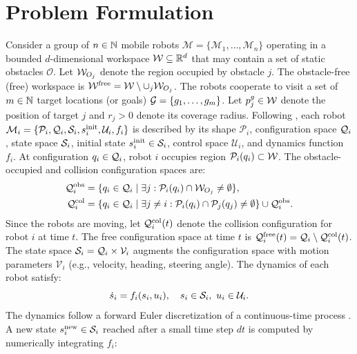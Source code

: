 \documentclass{article}
\providecommand{\obst}{\mathcal{O}}
\providecommand{\free}{\mathrm{free}}
\providecommand{\obs}{\mathrm{obs}}
\providecommand{\col}{\mathrm{col}}
\begin{document}
\section{Problem Formulation}
\label{sec:prob}
Consider a group of $n \in \mathbb{N}$ mobile robots $\mathcal{M} = \{ \mathcal{M}_1, \ldots, \mathcal{M}_n \}$ operating in a bounded $d$-dimensional workspace $\mathcal{W} \subseteq \mathbb{R}^d$ that may contain a set of static obstacles $\obst$. Let $\mathcal{W}_{O_j}$ denote the region occupied by obstacle $j$. The obstacle-free (free) workspace is $\wspace^{\free} = \wspace \setminus \cup_j \wspace_{O_j}$. The robots cooperate to visit a set of $m \in \mathbb{N}$ target locations (or goals) $\mathcal{G} = \{ g_1, \ldots, g_m \}$. Let $p_j^g \in \mathcal{W}$ denote the position of target $j$ and $r_j > 0$ denote its coverage radius. Following \citet{le2021icra}, each robot $\mathcal{M}_i = \{ \mathcal{P}_i, \mathcal{Q}_i, \mathcal{S}_i, s_i^{\operatorname{init}}, \mathcal{U}_i, f_i \}$ is described by its shape $\mathcal{P}_i$, configuration space $\mathcal{Q}_i$, state space $\mathcal{S}_i$, initial state $s_i^{\operatorname{init}} \in \mathcal{S}_i$, control space $\mathcal{U}_i$, and dynamics function $f_i$. At configuration $q_i \in \mathcal{Q}_i$, robot $i$ occupies region $\mathcal{P}_i(q_i) \subset \mathcal{W}$. The obstacle-occupied and collision configuration spaces are:
\begin{align}
    \config_i^{\obs} &= \{q_i \in \config_i \mid \exists  j : \mathcal{P}_i(q_i) \cap \wspace_{O_j} \neq \emptyset\}, \label{eq:obs_config} \\
    \config_i^{\col} &= \{q_i \in \config_i \mid \exists  j \neq i : \mathcal{P}_i(q_i) \cap \mathcal{P}_j(q_j) \neq \emptyset\} \cup \config_i^{\obs}. \label{eq:col_config}
\end{align}
Since the robots are moving, let $\config_i^{\col}(t)$ denote the collision configuration for robot $i$ at time $t$. The free configuration space at time $t$ is $\config_i^{\free}(t) = \config_i \setminus \config_i^{\col}(t)$. The state space $\mathcal{S}_i = \mathcal{Q}_i \times \mathcal{V}_i$ augments the configuration space with motion parameters $\mathcal{V}_i$ (e.g., velocity, heading, steering angle). The dynamics of each robot satisfy:
\begin{equation}
    \dot{s}_i = f_i(s_i, u_i), \quad s_i \in \mathcal{S}_i,\ u_i \in \mathcal{U}_i. \label{eq:dynamics}
\end{equation}
The dynamics follow a forward Euler discretization of a continuous-time process \citep{feedback2020}. A new state $s_i^{\mathrm{new}} \in \mathcal{S}_i$ reached after a small time step $dt$ is computed by numerically integrating $f_i$:
\end{document}
